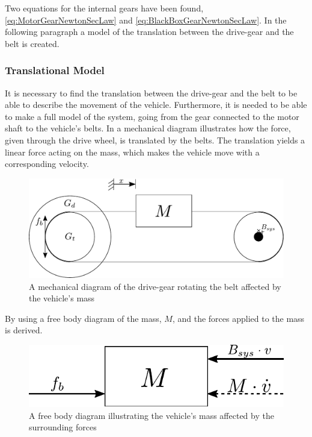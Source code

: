 Two equations for the internal gears have been found, \eqref{eq:MotorGearNewtonSecLaw} and \eqref{eq:BlackBoxGearNewtonSecLaw}. In the following paragraph a model of the translation between the drive-gear and the belt is created.

\subsubsection{Translational Model}\label{BeltModel}
It is necessary to find the translation between the drive-gear and the belt to be able to describe the movement of the vehicle. Furthermore, it is needed to be able to make a full model of the system, going from the gear connected to the motor shaft to the vehicle's belts. In  a mechanical diagram illustrates how the force, given through the drive wheel, is translated by the belts. The translation yields a linear force acting on the mass, which makes the vehicle move with a corresponding velocity.

\begin{figure}[H]
	\centering
	\includegraphics[scale=0.8]{figures/mechanicalDrawingBelt.pdf}
	\caption{A mechanical diagram of the drive-gear rotating the belt affected by the vehicle's mass}
	\label{fig:BeltMechanicalDiagram}
\end{figure}

By using  a free body diagram of the mass, $M$, and the forces applied to the mass is derived.

\begin{figure}[H]
	\centering
	\includegraphics[scale=.8]{figures/freeBodyBelt.pdf}
	\caption{A free body diagram illustrating the vehicle's mass affected by the surrounding forces}
	\label{fig:BeltFreeBodyDiagram}
\end{figure}

